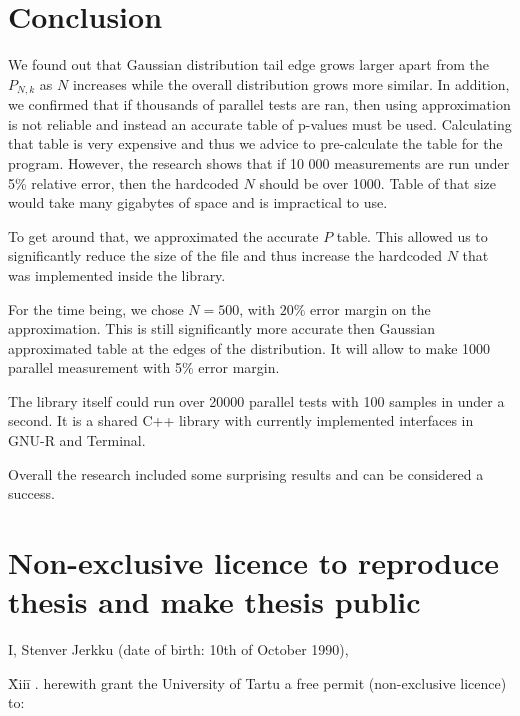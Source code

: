 \documentclass[12pt]{article}
\begin{document}
{\section{Conclusion}
We found out that Gaussian distribution tail edge grows larger apart from the $P_{N, k}$ as $N$ increases while the overall distribution grows more similar. In addition, we confirmed that if thousands of parallel tests are ran, then using approximation is not reliable and instead an accurate table of p-values must be used. Calculating that table is very expensive and thus we advice to pre-calculate the table for the program. However, the research shows that if 10 000 measurements are run under 5\% relative error, then the hardcoded $N$ should be over 1000. Table of that size would take many gigabytes of space and is impractical to use.

To get around that, we approximated the accurate $P$ table. This allowed us to significantly reduce the size of the file and thus increase the hardcoded $N$ that was implemented inside the library.

For the time being, we chose $N=500$, with $20\%$ error margin on the approximation. This is still significantly more accurate then Gaussian approximated table at the edges of the distribution. It will allow to make 1000 parallel measurement with 5\% error margin.

The library itself could run over 20000 parallel tests with 100 samples in under a second. It is a shared C++ library with currently implemented interfaces in GNU-R and Terminal.

Overall the research included some surprising results and can be considered a success.

\newpage




\appendix
\pagebreak

\section*{\small Non-exclusive licence to reproduce thesis and make thesis public}

I, Stenver Jerkku (date of birth: 10th of October 1990),

\begin{tabbing}
\= Xiii\=\kill
{}. \> herewith grant the University of Tartu a free permit (non-exclusive licence) to:\\\\


\end{tabbing}}
\end{document}
